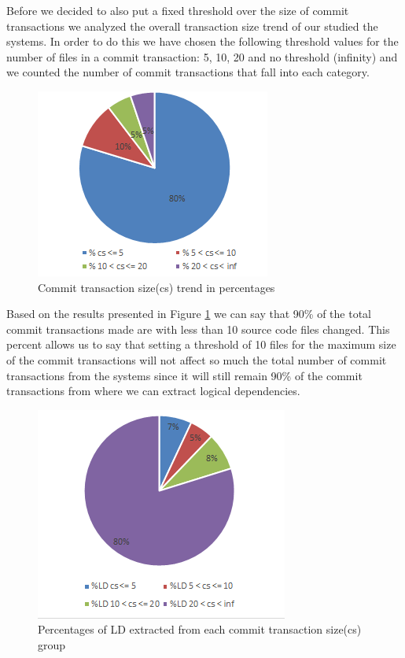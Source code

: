 \documentclass[conference]{IEEEtran}
\begin{document}
Before we decided to also put a fixed threshold over the size of commit transactions we analyzed the overall transaction size trend of our studied the systems.
In order to do this we have chosen the following threshold values for the number of files in a commit transaction: 5, 10, 20 and no threshold (infinity) and we counted the number of commit transactions that fall into each category.


\begin{figure}[h]
\includegraphics[scale=0.9]{fig_cs.png}
\caption{Commit transaction size(cs) trend in percentages}
\label{fig:fig_cs}
\centering
\end{figure}


Based on the results presented in Figure \ref{fig:fig_cs} we can say that 90\% of the total commit transactions made are with less than 10 source code files changed. This percent allows us to say that setting a threshold of 10 files for the maximum size of the commit transactions will not affect so much the total number of commit transactions from the systems since it will still remain 90\% of the commit transactions from where we can extract logical dependencies.


\begin{figure}[h]
\includegraphics[scale=0.9]{fig_ld_ts.png}
\caption{Percentages of LD extracted from each commit transaction size(cs) group}
\label{fig:fig_ld_ts}
\centering
\end{figure}
\end{document}
